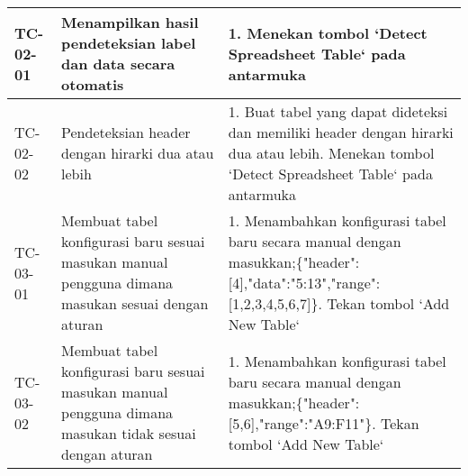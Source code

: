 \begin{small}
\begin{longtable}{ | p{2cm} | p{4cm} | p{7cm} | }
	TC-02-01 & Menampilkan hasil pendeteksian label dan data secara otomatis & 1. Menekan tombol `Detect Spreadsheet Table` pada antarmuka\\ \hline
	TC-02-02 & Pendeteksian header dengan hirarki dua atau lebih & 1. Buat tabel yang dapat dideteksi dan memiliki header dengan hirarki dua atau lebih\newline 2. Menekan tombol `Detect Spreadsheet Table` pada antarmuka\\ \hline 

	TC-03-01 & Membuat tabel konfigurasi baru sesuai masukan manual pengguna dimana masukan sesuai dengan aturan & 1. Menambahkan konfigurasi tabel baru secara manual dengan masukkan;\newline \{\newline  "header":[4],\newline  "data":"5:13",\newline  "range":[1,2,3,4,5,6,7]\newline \}\newline 2. Tekan tombol `Add New Table`\\ \hline 
	TC-03-02 & Membuat tabel konfigurasi baru sesuai masukan manual pengguna dimana masukan tidak sesuai dengan aturan & 1. Menambahkan konfigurasi tabel baru secara manual dengan masukkan;\newline \{\newline  "header":[5,6],\newline  "range":"A9:F11"\newline \}\newline 2. Tekan tombol `Add New Table`\\ \hline 


\end{longtable}
\end{small}
